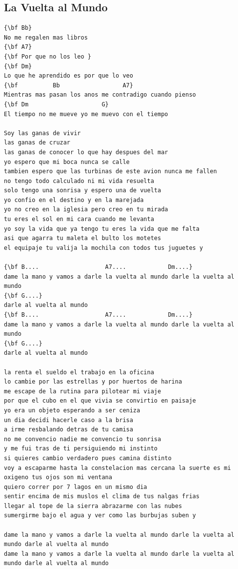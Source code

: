 \documentclass[a4paper]{article}
\begin{document}
\subsection{La Vuelta al Mundo}
\begin{Verbatim}[commandchars=\\\{\}]
{\bf Bb}
No me regalen mas libros
{\bf A7}
{\bf Por que no los leo }
{\bf Dm}
Lo que he aprendido es por que lo veo 
{\bf          Bb                  A7}
Mientras mas pasan los anos me contradigo cuando pienso 
{\bf Dm                     G}
El tiempo no me mueve yo me muevo con el tiempo 

Soy las ganas de vivir 
las ganas de cruzar 
las ganas de conocer lo que hay despues del mar 
yo espero que mi boca nunca se calle 
tambien espero que las turbinas de este avion nunca me fallen 
no tengo todo calculado ni mi vida resuelta 
solo tengo una sonrisa y espero una de vuelta
yo confio en el destino y en la marejada 
yo no creo en la iglesia pero creo en tu mirada 
tu eres el sol en mi cara cuando me levanta 
yo soy la vida que ya tengo tu eres la vida que me falta 
asi que agarra tu maleta el bulto los motetes 
el equipaje tu valija la mochila con todos tus juguetes y 

{\bf B....                   A7....            Dm....}
dame la mano y vamos a darle la vuelta al mundo darle la vuelta al mundo 
{\bf G....}
darle al vuelta al mundo 
{\bf B....                   A7....            Dm....}
dame la mano y vamos a darle la vuelta al mundo darle la vuelta al mundo 
{\bf G....}
darle al vuelta al mundo 

la renta el sueldo el trabajo en la oficina 
lo cambie por las estrellas y por huertos de harina 
me escape de la rutina para pilotear mi viaje 
por que el cubo en el que vivia se convirtio en paisaje 
yo era un objeto esperando a ser ceniza 
un dia decidi hacerle caso a la brisa 
a irme resbalando detras de tu camisa 
no me convencio nadie me convencio tu sonrisa 
y me fui tras de ti persiguiendo mi instinto 
si quieres cambio verdadero pues camina distinto 
voy a escaparme hasta la constelacion mas cercana la suerte es mi oxigeno tus ojos son mi ventana 
quiero correr por 7 lagos en un mismo dia 
sentir encima de mis muslos el clima de tus nalgas frias 
llegar al tope de la sierra abrazarme con las nubes 
sumergirme bajo el agua y ver como las burbujas suben y

dame la mano y vamos a darle la vuelta al mundo darle la vuelta al mundo darle al vuelta al mundo 
dame la mano y vamos a darle la vuelta al mundo darle la vuelta al mundo darle al vuelta al mundo

\end{Verbatim}
\newpage
\end{document}
